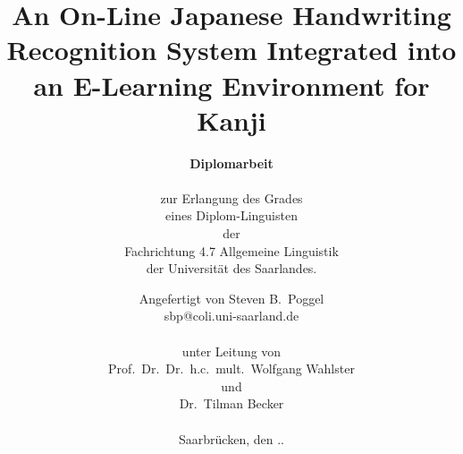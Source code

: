 \documentclass[a4paper]{book}
\title{An On-Line Japanese Handwriting Recognition System Integrated into an E-Learning Environment for Kanji}
\author{\textbf{\large Diplomarbeit} \\
\textsc{ } \\
zur Erlangung des Grades \\
eines Diplom-Linguisten\\
der \\
Fachrichtung 4.7 Allgemeine Linguistik \\ 
der Universität des Saarlandes.}
\date{
Angefertigt von
Steven B.~Poggel\\
sbp@coli.uni-saarland.de \\
\textsc{ } \\
unter Leitung von \\
Prof.~Dr.~Dr.~h.c.~mult.~Wolfgang Wahlster \\
und \\
Dr.~Tilman Becker \\
\textsc{ } \\
Saarbrücken, den \the\day.\the\month.\the\year}
\begin{document}

\appendix
 \listoffigures
 \lstlistoflistings
 \listoftables
 
\end{document}
